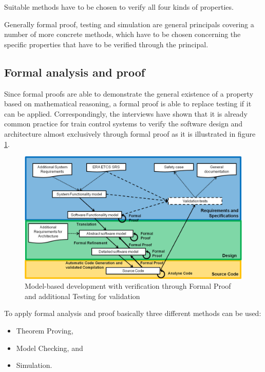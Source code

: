 \documentclass{./template/openetcs_report}
\begin{document}
Suitable methods have to be chosen to verify all four kinds of properties. 

Generally formal proof, testing and simulation are general principals covering a number of more concrete methods, which have to be chosen concerning the specific properties that have to be verified through the principal.

\subsection{ Formal analysis and proof}

Since formal proofs are able to demonstrate the general existence of a property based on mathematical reasoning, a formal proof is able to replace testing if it can be applied. Correspondingly, the interviews have shown that it is already common practice for train control systems to verify the software design and architecture almost exclusively through formal proof as it is illustrated in figure \ref{fig: MBD-Formal-Proof}.

\begin{figure}[ht]
\centering
\includegraphics[scale=0.6]{Lifecycle-Model-based-Approach-Formal-Proof.png}
\caption{Model-based development with verification through Formal Proof and additional Testing for validation}
\label{fig: MBD-Formal-Proof}
\end{figure}

To apply formal analysis and proof basically three different methods can be used: 

\vspace{-10pt}
\begin{itemize}[topsep=2pt, partopsep=2pt,itemsep=2pt,parsep=2pt]
\item Theorem Proving,	
\item Model Checking, and
\item Simulation.	
\end{itemize}
\end{document}
